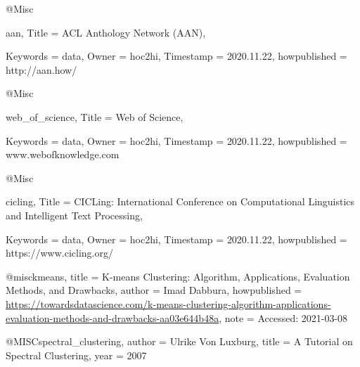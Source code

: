 @Misc{aan,
  Title                    = {ACL Anthology Network (AAN)},

  Keywords                 = {data},
  Owner                    = {hoc2hi},
  Timestamp                = {2020.11.22},
  howpublished                      = {http://aan.how/}
}

@Misc{web_of_science,
  Title                    = {Web of Science},

  Keywords                 = {data},
  Owner                    = {hoc2hi},
  Timestamp                = {2020.11.22},
  howpublished                      = {www.webofknowledge.com}
}

@Misc{cicling,
  Title                    = {CICLing: International Conference on Computational Linguistics and Intelligent Text Processing},

  Keywords                 = {data},
  Owner                    = {hoc2hi},
  Timestamp                = {2020.11.22},
  howpublished                      = {https://www.cicling.org/}
}


@misc{kmeans,
  title = {K-means Clustering: Algorithm, Applications, Evaluation Methods, and Drawbacks},
  author = {Imad Dabbura},
  howpublished = {\url{https://towardsdatascience.com/k-means-clustering-algorithm-applications-evaluation-methods-and-drawbacks-aa03e644b48a}},
  note = {Accessed: 2021-03-08}
}

@MISC{spectral_clustering,
    author = {Ulrike Von Luxburg},
    title = {A Tutorial on Spectral Clustering},
    year = {2007}
}

